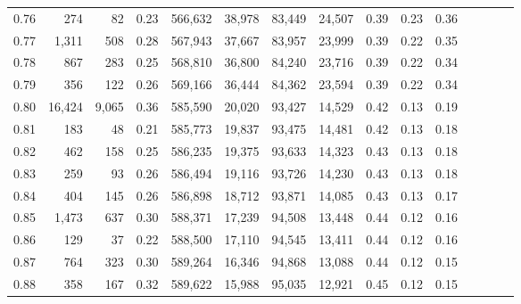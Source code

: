 \begin{tabular}{rrrcrrrrrrrrrrr}
0.76 &     274 &      82 &                                       0.23 &  566,632 &   38,978 &   83,449 &   24,507 &  0.39 &  0.23 &                         0.36 \\
0.77 &   1,311 &     508 &                                       0.28 &  567,943 &   37,667 &   83,957 &   23,999 &  0.39 &  0.22 &                         0.35 \\
0.78 &     867 &     283 &                                       0.25 &  568,810 &   36,800 &   84,240 &   23,716 &  0.39 &  0.22 &                         0.34 \\
0.79 &     356 &     122 &                                       0.26 &  569,166 &   36,444 &   84,362 &   23,594 &  0.39 &  0.22 &                         0.34 \\
0.80 &  16,424 &   9,065 &                                       0.36 &  585,590 &   20,020 &   93,427 &   14,529 &  0.42 &  0.13 &                         0.19 \\
0.81 &     183 &      48 &                                       0.21 &  585,773 &   19,837 &   93,475 &   14,481 &  0.42 &  0.13 &                         0.18 \\
0.82 &     462 &     158 &                                       0.25 &  586,235 &   19,375 &   93,633 &   14,323 &  0.43 &  0.13 &                         0.18 \\
0.83 &     259 &      93 &                                       0.26 &  586,494 &   19,116 &   93,726 &   14,230 &  0.43 &  0.13 &                         0.18 \\
0.84 &     404 &     145 &                                       0.26 &  586,898 &   18,712 &   93,871 &   14,085 &  0.43 &  0.13 &                         0.17 \\
0.85 &   1,473 &     637 &                                       0.30 &  588,371 &   17,239 &   94,508 &   13,448 &  0.44 &  0.12 &                         0.16 \\
0.86 &     129 &      37 &                                       0.22 &  588,500 &   17,110 &   94,545 &   13,411 &  0.44 &  0.12 &                         0.16 \\
0.87 &     764 &     323 &                                       0.30 &  589,264 &   16,346 &   94,868 &   13,088 &  0.44 &  0.12 &                         0.15 \\
0.88 &     358 &     167 &                                       0.32 &  589,622 &   15,988 &   95,035 &   12,921 &  0.45 &  0.12 &                         0.15 \\

\end{tabular}
